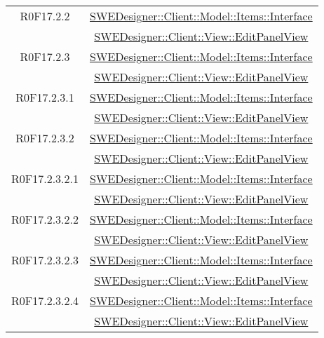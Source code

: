 \documentclass[../DefinizioneDiProdotto.tex]{subfiles}
\begin{document}
\begin{longtable}{|c|c|}
				R0F17.2.2
				& \hyperlink{SWEDesigner::Client::Model::Items::Interface}{SWEDesigner::Client::Model::Items::Interface}\\
				& \hyperlink{SWEDesigner::Client::View::EditPanelView}{SWEDesigner::Client::View::EditPanelView}\\
				\hline

				R0F17.2.3
				& \hyperlink{SWEDesigner::Client::Model::Items::Interface}{SWEDesigner::Client::Model::Items::Interface}\\
				& \hyperlink{SWEDesigner::Client::View::EditPanelView}{SWEDesigner::Client::View::EditPanelView}\\
				\hline

				R0F17.2.3.1
				& \hyperlink{SWEDesigner::Client::Model::Items::Interface}{SWEDesigner::Client::Model::Items::Interface}\\
				& \hyperlink{SWEDesigner::Client::View::EditPanelView}{SWEDesigner::Client::View::EditPanelView}\\
				\hline

				R0F17.2.3.2
				& \hyperlink{SWEDesigner::Client::Model::Items::Interface}{SWEDesigner::Client::Model::Items::Interface}\\
				& \hyperlink{SWEDesigner::Client::View::EditPanelView}{SWEDesigner::Client::View::EditPanelView}\\
				\hline

				R0F17.2.3.2.1
				& \hyperlink{SWEDesigner::Client::Model::Items::Interface}{SWEDesigner::Client::Model::Items::Interface}\\
				& \hyperlink{SWEDesigner::Client::View::EditPanelView}{SWEDesigner::Client::View::EditPanelView}\\
				\hline

				R0F17.2.3.2.2
				& \hyperlink{SWEDesigner::Client::Model::Items::Interface}{SWEDesigner::Client::Model::Items::Interface}\\
				& \hyperlink{SWEDesigner::Client::View::EditPanelView}{SWEDesigner::Client::View::EditPanelView}\\
				\hline

				R0F17.2.3.2.3
				& \hyperlink{SWEDesigner::Client::Model::Items::Interface}{SWEDesigner::Client::Model::Items::Interface}\\
				& \hyperlink{SWEDesigner::Client::View::EditPanelView}{SWEDesigner::Client::View::EditPanelView}\\
				\hline

				R0F17.2.3.2.4
				& \hyperlink{SWEDesigner::Client::Model::Items::Interface}{SWEDesigner::Client::Model::Items::Interface}\\
				& \hyperlink{SWEDesigner::Client::View::EditPanelView}{SWEDesigner::Client::View::EditPanelView}\\
				\hline


\end{longtable}
\end{document}
